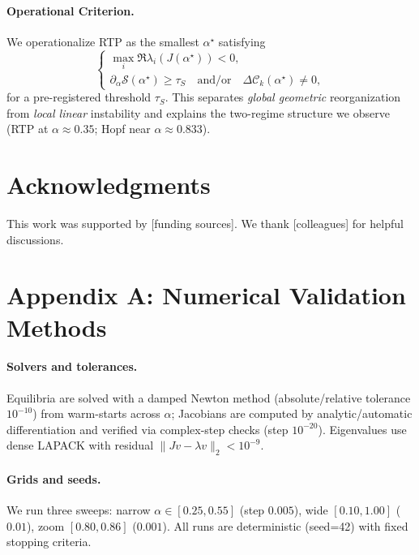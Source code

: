 \documentclass[11pt,twocolumn]{article}
\begin{document}
\paragraph{Operational Criterion.}
We operationalize RTP as the smallest $\alpha^\star$ satisfying
\[
\begin{cases}
\max\limits_i \Re\lambda_i(J(\alpha^\star)) < 0,\\[2pt]
\partial_\alpha \mathcal{S}(\alpha^\star) \ge \tau_S\quad \text{and/or}\quad \Delta \mathcal{C}_k(\alpha^\star)\neq 0,
\end{cases}
\]
for a pre-registered threshold $\tau_S$. This separates \emph{global geometric} reorganization from \emph{local linear} instability and explains the two-regime structure we observe (RTP at $\alpha\!\approx\!0.35$; Hopf near $\alpha\!\approx\!0.833$).

\section*{Acknowledgments}

This work was supported by [funding sources]. We thank [colleagues] for helpful discussions.




\appendix

\section*{Appendix A: Numerical Validation Methods}
\label{app:numerics}

\paragraph{Solvers and tolerances.}
Equilibria are solved with a damped Newton method (absolute/relative tolerance $10^{-10}$) from warm-starts across $\alpha$; Jacobians are computed by analytic/automatic differentiation and verified via complex-step checks (step $10^{-20}$). Eigenvalues use dense LAPACK with residual $\|\!Jv-\lambda v\!\|_2 < 10^{-9}$.

\paragraph{Grids and seeds.}
We run three sweeps: narrow $\alpha\!\in\![0.25,0.55]$ (step $0.005$), wide $[0.10,1.00]$ ($0.01$), zoom $[0.80,0.86]$ ($0.001$). All runs are deterministic (seed=42) with fixed stopping criteria.
\end{document}
